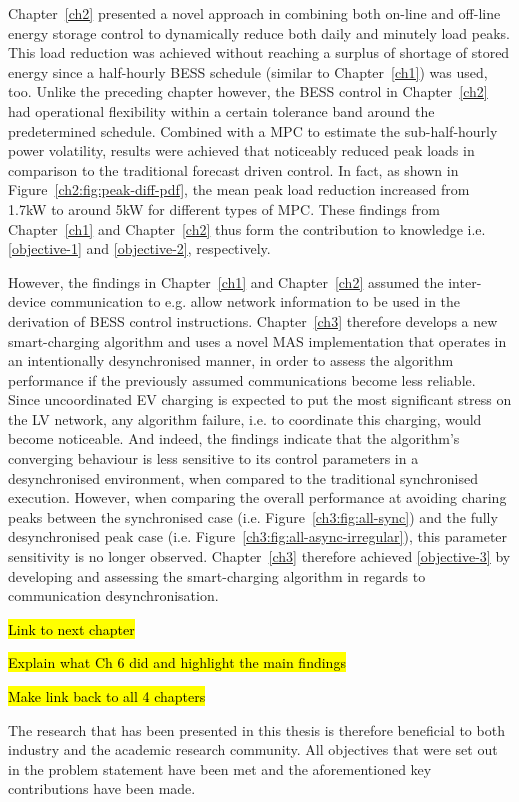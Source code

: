 Chapter~\ref{ch2} presented a novel approach in combining both on-line and off-line energy storage control to dynamically reduce both daily and minutely load peaks.
This load reduction was achieved without reaching a surplus of shortage of stored energy since a half-hourly BESS schedule (similar to Chapter~\ref{ch1}) was used, too.
Unlike the preceding chapter however, the BESS control in Chapter~\ref{ch2} had operational flexibility within a certain tolerance band around the predetermined schedule.
Combined with a MPC to estimate the sub-half-hourly power volatility, results were achieved that noticeably reduced peak loads in comparison to the traditional forecast driven control.
In fact, as shown in Figure~\ref{ch2:fig:peak-diff-pdf}, the mean peak load reduction increased from 1.7kW to around 5kW for different types of MPC.
These findings from Chapter~\ref{ch1} and Chapter~\ref{ch2} thus form the contribution to knowledge i.e. \ref{objective-1} and \ref{objective-2}, respectively.

However, the findings in Chapter~\ref{ch1} and Chapter~\ref{ch2} assumed the inter-device communication to e.g. allow network information to be used in the derivation of BESS control instructions.
Chapter~\ref{ch3} therefore develops a new smart-charging algorithm and uses a novel MAS implementation that operates in an intentionally desynchronised manner, in order to assess the algorithm performance if the previously assumed communications become less reliable.
Since uncoordinated EV charging is expected to put the most significant stress on the LV network, any algorithm failure, i.e. to coordinate this charging, would become noticeable.
And indeed, the findings indicate that the algorithm's converging behaviour is less sensitive to its control parameters in a desynchronised environment, when compared to the traditional synchronised execution.
However, when comparing the overall performance at avoiding charing peaks between the synchronised case (i.e. Figure~\ref{ch3:fig:all-sync}) and the fully desynchronised peak case (i.e. Figure~\ref{ch3:fig:all-async-irregular}), this parameter sensitivity is no longer observed.
Chapter~\ref{ch3} therefore achieved \ref{objective-3} by developing and assessing the smart-charging algorithm in regards to communication desynchronisation.

\hl{Link to next chapter}

\hl{Explain what Ch 6 did and highlight the main findings}

\hl{Make link back to all 4 chapters}


The research that has been presented in this thesis is therefore beneficial to both industry and the academic research community.
All objectives that were set out in the problem statement have been met and the aforementioned key contributions have been made.



